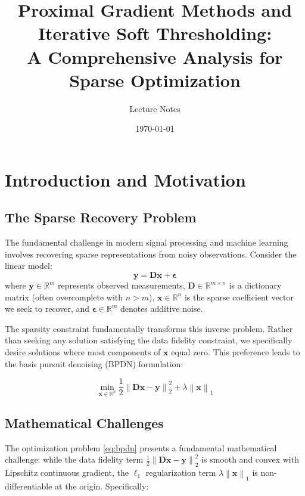 \documentclass[12pt]{article}
\title{Proximal Gradient Methods and Iterative Soft Thresholding:\\
A Comprehensive Analysis for Sparse Optimization}
\author{Lecture Notes}
\date{\today}
\renewcommand{\vec}[1]{\mathbf{#1}}
\newcommand{\norm}[1]{\left\lVert#1\right\rVert}
\newcommand{\R}{\mathbb{R}}
\theoremstyle{definition}
\begin{document}
\maketitle

\tableofcontents
\newpage

\section{Introduction and Motivation}

\subsection{The Sparse Recovery Problem}

The fundamental challenge in modern signal processing and machine learning involves recovering sparse representations from noisy observations. Consider the linear model:
\begin{equation}
    \vec{y} = \vec{D}\vec{x} + \vec{\epsilon}
    \label{eq:linear_model}
\end{equation}
where $\vec{y} \in \R^m$ represents observed measurements, $\vec{D} \in \R^{m \times n}$ is a dictionary matrix (often overcomplete with $n > m$), $\vec{x} \in \R^n$ is the sparse coefficient vector we seek to recover, and $\vec{\epsilon} \in \R^m$ denotes additive noise.

The sparsity constraint fundamentally transforms this inverse problem. Rather than seeking any solution satisfying the data fidelity constraint, we specifically desire solutions where most components of $\vec{x}$ equal zero. This preference leads to the basis pursuit denoising (BPDN) formulation:

\begin{equation}
    \min_{\vec{x} \in \R^n} \frac{1}{2}\norm{\vec{D}\vec{x} - \vec{y}}_2^2 + \lambda\norm{\vec{x}}_1
    \label{eq:bpdn}
\end{equation}

\subsection{Mathematical Challenges}

The optimization problem \eqref{eq:bpdn} presents a fundamental mathematical challenge: while the data fidelity term $\frac{1}{2}\norm{\vec{D}\vec{x} - \vec{y}}_2^2$ is smooth and convex with Lipschitz continuous gradient, the $\ell_1$ regularization term $\lambda\norm{\vec{x}}_1$ is non-differentiable at the origin. Specifically:
\end{document}
